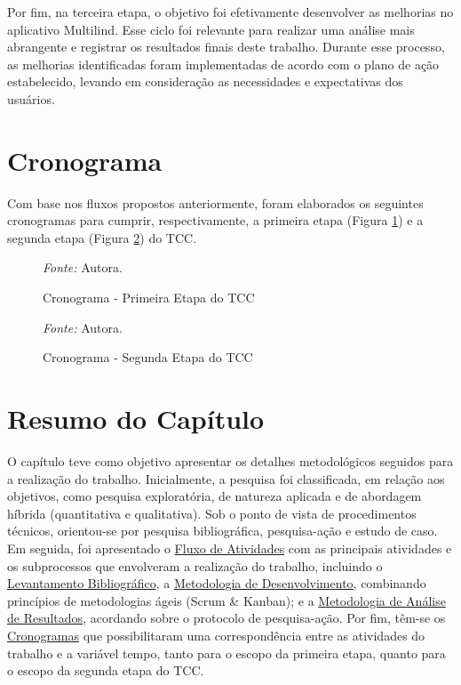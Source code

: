 Por fim, na terceira etapa, o objetivo foi efetivamente desenvolver as melhorias no aplicativo Multilind. Esse ciclo foi relevante para realizar uma análise mais abrangente e registrar os resultados finais deste trabalho. Durante esse processo, as melhorias identificadas foram implementadas de acordo com o plano de ação estabelecido, levando em consideração as necessidades e expectativas dos usuários.

\section{Cronograma}
\label{sec:Cronograma}
Com base nos fluxos propostos anteriormente, foram elaborados os seguintes cronogramas para cumprir, respectivamente, a primeira etapa (Figura \ref{fig06}) e a segunda etapa (Figura \ref{fig07}) do TCC.

\begin{figure}[h!]
	\centering
	\caption{Cronograma - Primeira Etapa do TCC}
	\begin{tablenotes}[flushleft]
		\centering
		\item \textit{Fonte:} Autora.
	\end{tablenotes}
	\label{fig06}
\end{figure}

\pagebreak

\begin{figure}[h!]
	\centering
	\caption{Cronograma - Segunda Etapa do TCC}
	\begin{tablenotes}[flushleft]
		\centering
		\item \textit{Fonte:} Autora.
	\end{tablenotes}
	\label{fig07}
\end{figure}

\section{Resumo do Capítulo}
\label{sec:Resumo do Capitulo}
O capítulo teve como objetivo apresentar os detalhes metodológicos seguidos para a realização do trabalho. Inicialmente, a pesquisa foi classificada, em relação aos objetivos, como pesquisa exploratória, de natureza aplicada 
e de abordagem híbrida (quantitativa e qualitativa). Sob o ponto de vista de procedimentos técnicos, orientou-se por pesquisa bibliográfica, pesquisa-ação e estudo de caso. Em seguida, foi apresentado o \hyperref[sec:Fluxo de Atividades]{Fluxo de Atividades}
com as principais atividades e os subprocessos que envolveram a realização do trabalho, incluindo o \hyperref[sec:Levantamento Bibliografico]{Levantamento Bibliográfico}, a \hyperref[sec:Metodologia de Desenvolvimento]{Metodologia de Desenvolvimento}, combinando princípios de metodologias ágeis (Scrum \& Kanban); e a 
\hyperref[sec:Metodologia de Analise de Resultados]{Metodologia de Análise de Resultados}, acordando sobre o protocolo de pesquisa-ação. Por fim, têm-se os \hyperref[sec:Cronograma]{Cronogramas} que possibilitaram uma correspondência entre as atividades do trabalho e a variável tempo, tanto para o escopo da primeira 
etapa, quanto para o escopo da segunda etapa do TCC.